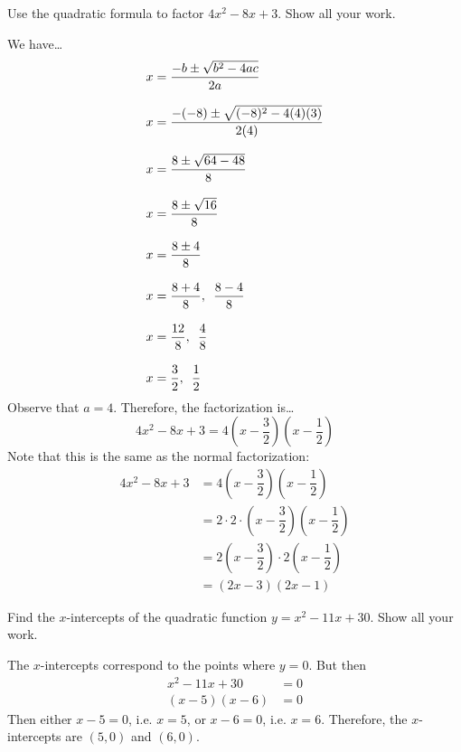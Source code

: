 \documentclass[11pt,letterpaper]{article}
\begin{document}
 Use the quadratic formula to factor $4x^2 - 8x + 3$. Show all your work. \pspace

\sol We have\dots \pspace
	\[
	\begin{aligned}
	x&= \dfrac{-b \pm \sqrt{b^2 - 4ac}}{2a} \\[0.3cm]
	x&= \dfrac{-(-8) \pm \sqrt{(-8)^2 - 4(4)(3)}}{2(4)} \\[0.3cm]
	x&= \dfrac{8 \pm \sqrt{64 - 48}}{8} \\[0.3cm]
	x&= \dfrac{8 \pm \sqrt{16}}{8} \\[0.3cm]
	x&= \dfrac{8 \pm 4}{8} \\[0.3cm]
	x&= \dfrac{8 + 4}{8}, \enskip \dfrac{8 - 4}{8} \\[0.3cm]
	x&= \dfrac{12}{8}, \enskip \dfrac{4}{8} \\[0.3cm]
	x&= \dfrac{3}{2}, \enskip \dfrac{1}{2}
	\end{aligned}
	\] \pspace
Observe that $a= 4$. Therefore, the factorization is\dots
	\[
	4x^2 - 8x + 3= 4 \left( x - \dfrac{3}{2} \right) \left( x - \dfrac{1}{2} \right)
	\]
Note that this is the same as the normal factorization:
	\[
	\begin{aligned}
	4x^2 - 8x + 3&= 4 \left( x - \dfrac{3}{2} \right) \left( x - \dfrac{1}{2} \right) \\[0.3cm]
	&= 2 \cdot 2 \cdot \left( x - \dfrac{3}{2} \right) \left( x - \dfrac{1}{2} \right) \\[0.3cm]
	&= 2 \left( x - \dfrac{3}{2} \right) \cdot 2 \left( x - \dfrac{1}{2} \right) \\[0.3cm]
	&= (2x - 3)(2x - 1)
	\end{aligned}
	\]





\newpage





 Find the $x$-intercepts of the quadratic function $y= x^2 - 11x + 30$. Show all your work. \pspace

\sol The $x$-intercepts correspond to the points where $y= 0$. But then
	\[
	\begin{aligned}
	x^2 - 11x + 30&= 0 \\[0.3cm]
	(x - 5)(x - 6)&= 0
	\end{aligned}
	\]
Then either $x - 5= 0$, i.e. $x= 5$, or $x - 6= 0$, i.e. $x= 6$. Therefore, the $x$-intercepts are $(5, 0)$ and $(6, 0)$. 
\end{document}
